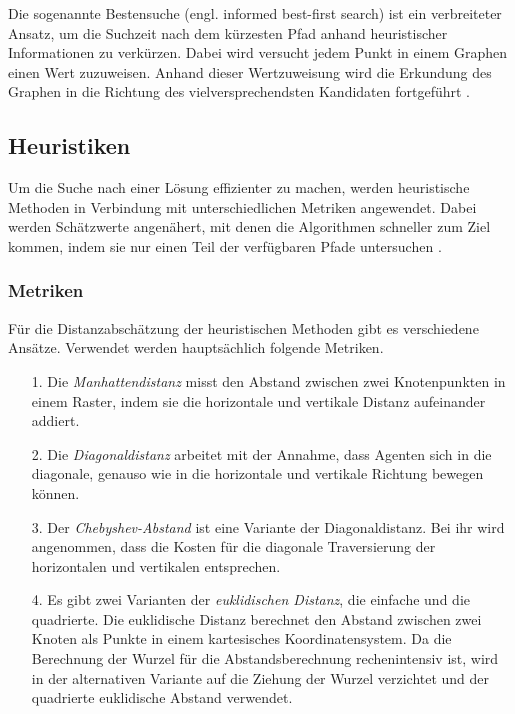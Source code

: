 Die sogenannte Bestensuche (engl. informed best-first search)
ist ein verbreiteter Ansatz, um die Suchzeit nach dem kürzesten Pfad anhand heuristischer Informationen zu verkürzen. Dabei wird versucht jedem Punkt in einem Graphen einen Wert zuzuweisen. Anhand dieser Wertzuweisung wird die Erkundung des Graphen in die Richtung des vielversprechendsten Kandidaten fortgeführt \cite{RinaDechterandJudeaPearl.1983}.

\subsection{Heuristiken}
Um die Suche nach einer Lösung effizienter zu machen, werden heuristische Methoden in Verbindung mit unterschiedlichen Metriken %
angewendet. Dabei werden Schätzwerte angenähert, mit denen die Algorithmen schneller zum Ziel kommen, indem sie nur einen Teil der verfügbaren Pfade untersuchen \cite{RinaDechterandJudeaPearl.1983}.

\subsubsection{Metriken}
Für die Distanzabschätzung der heuristischen Methoden gibt es verschiedene Ansätze. Verwendet werden hauptsächlich folgende Metriken.

\begin{itemize}
\item[1.] Die \textit{Manhattendistanz} misst den Abstand zwischen zwei Knotenpunkten in einem Raster, indem sie die horizontale und vertikale Distanz aufeinander addiert.

\item[2.] Die \textit{Diagonaldistanz} arbeitet mit der Annahme, dass Agenten sich in die diagonale, genauso wie in die horizontale und vertikale Richtung bewegen können.

\item[3.] Der \textit{Chebyshev-Abstand} ist eine Variante der Diagonaldistanz. Bei ihr wird angenommen, dass die Kosten für die diagonale Traversierung der horizontalen und vertikalen entsprechen.

\item[4.] Es gibt zwei Varianten der \textit{euklidischen Distanz}, die einfache und die quadrierte. Die euklidische Distanz berechnet den Abstand zwischen zwei Knoten als Punkte in einem kartesisches Koordinatensystem. Da die Berechnung der Wurzel für die Abstandsberechnung rechenintensiv ist, wird in der alternativen Variante auf die Ziehung der Wurzel verzichtet und der quadrierte euklidische Abstand verwendet\cite{You19}.

\end{itemize}
